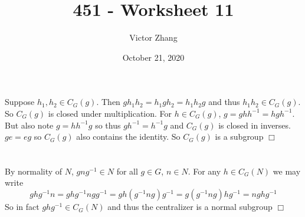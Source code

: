 \documentclass{article}
\title{451 - Worksheet 11}
\author{Victor Zhang}
\date{October 21, 2020}
\begin{document}
\maketitle

\section{}
Suppose $h_1, h_2 \in C_G(g)$. Then $gh_1h_2 = h_1gh_2 = h_1h_2g$ and thus $h_1h_2 \in C_G(g)$. So $C_G(g)$ is closed under multiplication.
For $h \in C_G(g)$, $g = ghh^{-1} = hgh^{-1}$. But also note $g = hh^{-1}g$ so thus $gh^{-1} = h^{-1}g$ and $C_G(g)$ is closed in inverses.
$ge = eg$ so $C_G(g)$ also contains the identity. So $C_G(g)$ is a subgroup $\Box$

\section{}
By normality of $N$, $gng^{-1} \in N$ for all $g \in G$, $n \in N$. For any $h \in C_G(N)$ we may write
$$ghg^{-1}n = ghg^{-1}ngg^{-1} = gh(g^{-1}ng)g^{-1} = g(g^{-1}ng)hg^{-1} = nghg^{-1}$$
So in fact $ghg^{-1} \in C_G(N)$ and thus the centralizer is a normal subgroup $\Box$
\end{document}
